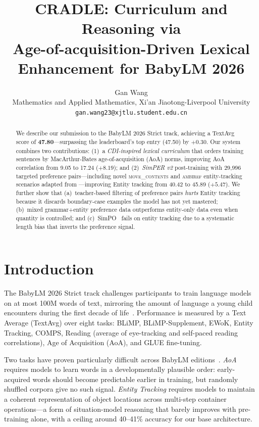 \documentclass[11pt]{article}
\title{CRADLE: Curriculum and Reasoning via\\
Age-of-acquisition-Driven Lexical Enhancement for BabyLM 2026}
\author{Gan Wang \\
 Mathematics and Applied Mathematics, Xi'an Jiaotong-Liverpool University \\
  \texttt{gan.wang23@xjtlu.student.edu.cn}}
\begin{document}
\maketitle

\begin{abstract}
We describe our submission to the BabyLM 2026 Strict track,
achieving a TextAvg score of \textbf{47.80}---surpassing the
leaderboard's top entry (47.50) by $+0.30$.
Our system combines two contributions:
(1)~a \emph{CDI-inspired lexical curriculum} that orders training
sentences by MacArthur-Bates age-of-acquisition (AoA) norms,
improving AoA correlation from 9.05 to 17.24 ($+8.19$); and
(2)~\emph{SimPER v2} post-training with 29{,}996 targeted preference
pairs---including novel \textsc{move\_contents} and \textsc{ambiref}
entity-tracking scenarios adapted from \citet{kim-schuster-2023}---improving
Entity tracking from 40.42 to 45.89 ($+5.47$).
We further show that (a)~teacher-based filtering of preference pairs
\emph{hurts} Entity tracking because it discards boundary-case
examples the model has not yet mastered;
(b)~mixed grammar+entity preference data outperforms entity-only data
even when quantity is controlled; and
(c)~SimPO~\citep{meng-etal-2024-simpo} fails on entity tracking due to
a systematic length bias that inverts the preference signal.
\end{abstract}

\section{Introduction}

The BabyLM 2026 Strict track challenges participants to train
language models on at most 100M words of text, mirroring the amount
of language a young child encounters during the first decade of
life~\citep{charpentier-etal-2025-findings}.
Performance is measured by a Text Average (TextAvg) over eight tasks:
BLiMP, BLiMP-Supplement, EWoK, Entity Tracking, COMPS,
Reading (average of eye-tracking and self-paced reading correlations),
Age of Acquisition (AoA), and GLUE fine-tuning.

Two tasks have proven particularly difficult across BabyLM editions~\citep{hu-etal-2024-findings}.
\emph{AoA} requires models to learn words in a developmentally plausible
order: early-acquired words should become predictable earlier in training,
but randomly shuffled corpora give no such signal.
\emph{Entity Tracking} requires models to maintain a coherent representation
of object locations across multi-step container operations---a
form of situation-model reasoning that barely improves with pre-training
alone, with a ceiling around 40--41\% accuracy for our base architecture.
\end{document}
